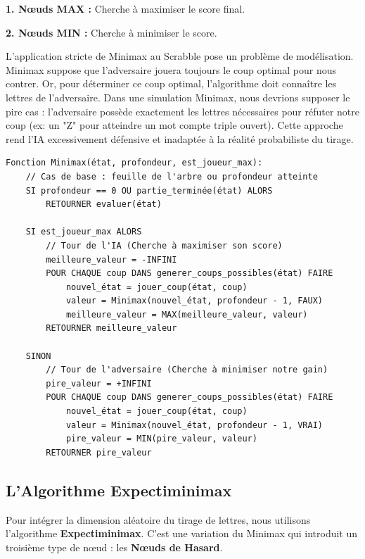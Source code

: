 \documentclass[a4paper]{article}
\begin{document}
\hangindent=1.5cm
\textbf{1. Nœuds MAX :} Cherche à maximiser le score final.

\vspace{1\baselineskip}
\hangindent=1.5cm
\textbf{2. Nœuds MIN :} Cherche à minimiser le score.

\hangindent=0.8mm
L'application stricte de Minimax au Scrabble pose un problème de modélisation. Minimax suppose que l'adversaire jouera toujours le coup optimal pour nous contrer. Or, pour déterminer ce coup optimal, l'algorithme doit connaître les lettres de l'adversaire. Dans une simulation Minimax, nous devrions supposer le pire cas : l'adversaire possède exactement les lettres nécessaires pour réfuter notre coup (ex: un "Z" pour atteindre un mot compte triple ouvert). Cette approche rend l'IA excessivement défensive et inadaptée à la réalité probabiliste du tirage.

\begin{besoinbox}
\label{lst:minimax_algo}
\begin{verbatim}
Fonction Minimax(état, profondeur, est_joueur_max):
    // Cas de base : feuille de l'arbre ou profondeur atteinte
    SI profondeur == 0 OU partie_terminée(état) ALORS
        RETOURNER evaluer(état)

    SI est_joueur_max ALORS
        // Tour de l'IA (Cherche à maximiser son score)
        meilleure_valeur = -INFINI
        POUR CHAQUE coup DANS generer_coups_possibles(état) FAIRE
            nouvel_état = jouer_coup(état, coup)
            valeur = Minimax(nouvel_état, profondeur - 1, FAUX)
            meilleure_valeur = MAX(meilleure_valeur, valeur)
        RETOURNER meilleure_valeur

    SINON
        // Tour de l'adversaire (Cherche à minimiser notre gain)
        pire_valeur = +INFINI
        POUR CHAQUE coup DANS generer_coups_possibles(état) FAIRE
            nouvel_état = jouer_coup(état, coup)
            valeur = Minimax(nouvel_état, profondeur - 1, VRAI)
            pire_valeur = MIN(pire_valeur, valeur)
        RETOURNER pire_valeur
\end{verbatim}
\end{besoinbox}

\subsection{L'Algorithme Expectiminimax}
\hangindent=0.8mm
Pour intégrer la dimension aléatoire du tirage de lettres, nous utilisons l'algorithme \textbf{Expectiminimax}. C'est une variation du Minimax qui introduit un troisième type de nœud : les \textbf{Nœuds de Hasard}.
\end{document}
